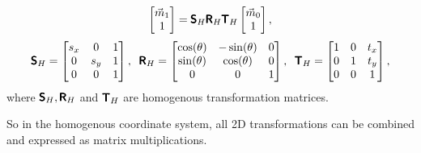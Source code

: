 \begin{equation}
    \begin{bmatrix} \vec{m}_1 \\ 1 \end{bmatrix} = 
    \pmb{\mathsf{S}}_H \pmb{\mathsf{R}}_H \pmb{\mathsf{T}}_H
    \begin{bmatrix} \vec{m}_0 \\ 1 \end{bmatrix},
\end{equation}
\begin{equation}
    \pmb{\mathsf{S}}_H = \begin{bmatrix} s_x & 0 & 1\\ 0 & s_y & 1 \\ 0 & 0 & 1\end{bmatrix}, \;\;
    \pmb{\mathsf{R}}_H = \begin{bmatrix} \cos(\theta) & -\sin(\theta) & 0 \\ \sin(\theta) & \cos(\theta) & 0 \\ 0 & 0 & 1 \end{bmatrix}, \;\;
    \pmb{\mathsf{T}}_H = \begin{bmatrix} 1 & 0 & t_x\\ 0 & 1 & t_y \\ 0 & 0 & 1 \end{bmatrix} ,
\end{equation}
where $\pmb{\mathsf{S}}_H, \pmb{\mathsf{R}}_H$ and $\pmb{\mathsf{T}}_H$ are homogenous transformation matrices.

So in the homogenous coordinate system, all 2D transformations can be combined and expressed as matrix multiplications.




